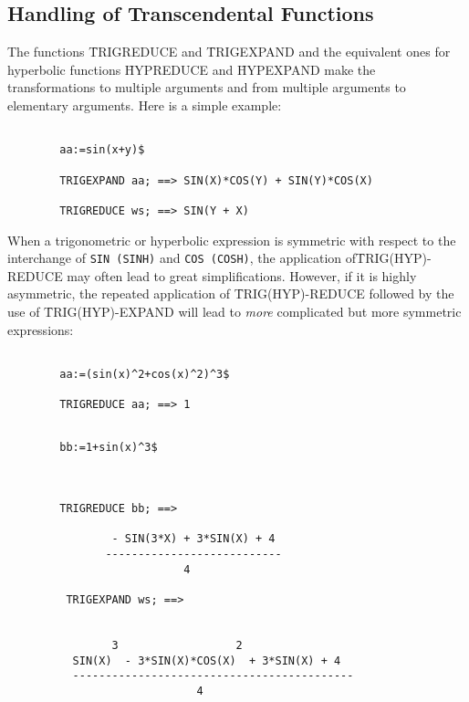 \subsection{Handling of Transcendental Functions}
The functions \f{TRIGREDUCE} and \f{TRIGEXPAND} and the equivalent
ones for hyperbolic functions \f{HYPREDUCE} and \f{HYPEXPAND}
make the transformations to multiple arguments and from
multiple arguments to elementary arguments. Here is a simple example:
\begin{verbatim}

        aa:=sin(x+y)$

        TRIGEXPAND aa; ==> SIN(X)*COS(Y) + SIN(Y)*COS(X)

        TRIGREDUCE ws; ==> SIN(Y + X)

\end{verbatim}
When a trigonometric or hyperbolic expression is symmetric with
respect to the interchange of {\tt SIN (SINH)} and {\tt COS (COSH)},
the application of\linebreak \f{TRIG(HYP)-REDUCE} may often lead to great
simplifications. However, if it is highly asymmetric, the repeated
application of \f{TRIG(HYP)-REDUCE} followed by the use of
\f{TRIG(HYP)-EXPAND} will lead to \emph{more} complicated
but more symmetric expressions:
\begin{verbatim}

        aa:=(sin(x)^2+cos(x)^2)^3$

        TRIGREDUCE aa; ==> 1

\end{verbatim}
\begin{verbatim}

        bb:=1+sin(x)^3$



        TRIGREDUCE bb; ==>

                - SIN(3*X) + 3*SIN(X) + 4
               ---------------------------
                           4

         TRIGEXPAND ws; ==>


                3                  2
          SIN(X)  - 3*SIN(X)*COS(X)  + 3*SIN(X) + 4
          -------------------------------------------
                             4

\end{verbatim}
